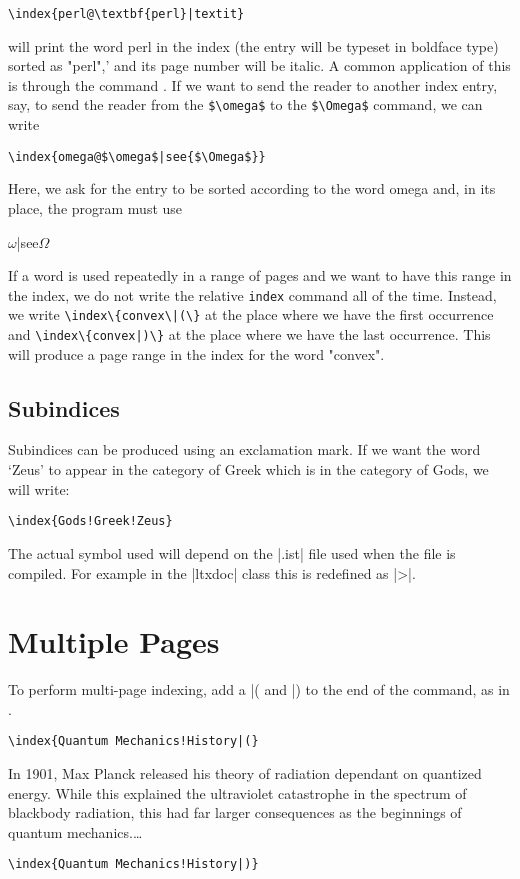 \begin{multicols}{2}
\verb+\index{perl@\textbf{perl}|textit}+


will print the word perl in the index (the entry will be typeset in boldface type) sorted
as "perl",’ and its page number will be italic. A common application of this is through
the command . If we want to send the reader to another index entry, say, to send
the reader from the \verb+$\omega$+ to the \verb+$\Omega$+ command, we can write

\verb+\index{omega@$\omega$|see{$\Omega$}}+


Here, we ask for the entry to be sorted according to the word omega and, in its place,
the program must use 

\begin{teX}
$\omega$|see{$\Omega$}
\end{teX}

If a word is used repeatedly in a range of pages and we want to have this range
in the index, we do not write the relative \texttt{index} command all of the time. Instead,
we write \verb+\index\{convex\|(\}+  at the place where we have the first occurrence and
\verb+\index\{convex|)\}+  at the place where we have the last occurrence. This will produce a
page range in the index for the word "convex".

\subsection{Subindices}
Subindices can be produced using an exclamation mark. If we want the word `Zeus'
to appear in the category of Greek which is in the category of Gods, we will write:

\verb+\index{Gods!Greek!Zeus}+

The actual symbol used will depend on the |.ist| file used when the file is compiled. For example in the |ltxdoc| class this is redefined as |>|.
\DeclareRobustCommand\textat{%
  \bgroup\makeatother \egroup
}


\section{Multiple Pages}

To perform multi-page indexing, add a |( and |) to the end of the \cmd{\index} command, as in 
.

{\small
\verb+\index{Quantum Mechanics!History|(}+

\narrower\narrower
In 1901, Max Planck released his theory of radiation dependant 
on quantized energy. While this explained the ultraviolet catastrophe
 in the spectrum of blackbody radiation, this had far larger consequences 
as the beginnings of quantum mechanics.\ldots

\verb+\index{Quantum Mechanics!History|)}+
}

\end{multicols}

